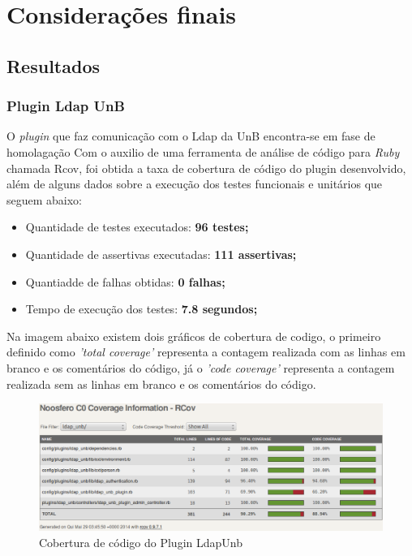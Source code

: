 \chapter{Considerações finais}
\label{consideracoes-finais}


\section{Resultados}
\label{results}

\subsection{Plugin Ldap UnB}

O \textit{plugin} que faz comunicação com o Ldap da UnB encontra-se em fase de homolagação
Com o auxilio de uma ferramenta de análise de código para \textit{Ruby} chamada Rcov, foi obtida a taxa de cobertura de código do plugin desenvolvido, além de alguns dados sobre a execução dos testes funcionais e unitários que seguem abaixo:

\begin{itemize}
\item Quantidade de testes executados: \textbf{96 testes;}
\item Quantidade de assertivas executadas: \textbf{111 assertivas;}
\item Quantiadde de falhas obtidas: \textbf{0 falhas;}
\item Tempo de execução dos testes: \textbf{7.8 segundos;}
\end{itemize}

Na imagem abaixo existem dois gráficos de cobertura de codigo, o primeiro definido como \textit{'total coverage'} representa a contagem realizada com as linhas em branco e os comentários do código, já o \textit{'code coverage'} representa a contagem realizada sem as linhas em branco e os comentários do código.

%
\begin{figure}[!h]
    \centering
    \includegraphics[keepaspectratio=false,scale=0.45]
      {figuras/cobertura_teste.eps}
    \caption{Cobertura de código do Plugin LdapUnb}
    \label{consideracoes_cobertura1}
\end{figure}
%

